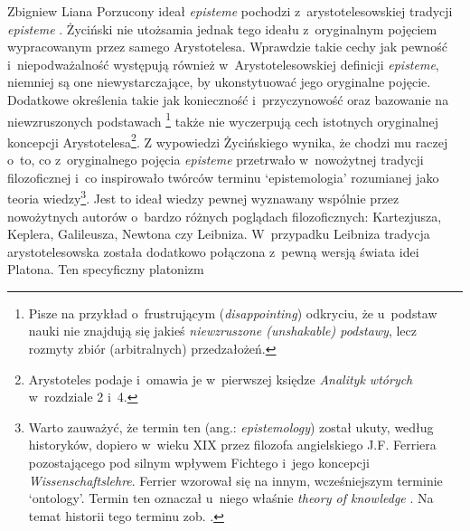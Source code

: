 \begin{artplenv}{Zbigniew Liana}
Porzucony ideał \textit{episteme} pochodzi z~arystotelesowskiej tradycji \textit{episteme}
\parencites[s.~102]{zycinski_jezyk_1983}[s.~46–55]{zycinski_granice_1993}.
Życiński nie utożsamia jednak tego ideału z~oryginalnym pojęciem wypracowanym
przez samego Arystotelesa. Wprawdzie takie cechy jak pewność i~niepodważalność występują również w~Arystotelesowskiej
definicji \textit{episteme}, niemniej są one niewystarczające, by ukonstytuować jego oryginalne pojęcie. Dodatkowe
określenia takie jak konieczność i~przyczynowość
\parencite[s.~46]{zycinski_granice_1993}
oraz bazowanie na
niewzruszonych podstawach
\parencites[s.~143]{zycinski_structure_1988}[s.~253]{zycinski_struktura_2013}\footnote{\label{lia-foo-32}Pisze na
przykład o~frustrującym (\textit{disappointing})
odkryciu, że u~podstaw nauki nie znajdują się jakieś \textit{niewzruszone (unshakable) podstawy}, lecz rozmyty zbiór
(arbitralnych) przedzałożeń.} także nie wyczerpują cech istotnych oryginalnej koncepcji
Arystotelesa\footnote{Arystoteles podaje i~omawia je w~pierwszej księdze \textit{Analityk wtórych} w~rozdziale 2 i~4.}. Z
wypowiedzi Życińskiego
\parencite*[s.~46]{zycinski_granice_1993}
wynika, że chodzi mu raczej o~to, co z~oryginalnego
pojęcia \textit{episteme} przetrwało w~nowożytnej tradycji filozoficznej i~co inspirowało twórców terminu `epistemologia'
rozumianej jako teoria wiedzy\footnote{Warto zauważyć, że termin ten (ang.: \textit{epistemology}) został ukuty,
według historyków, dopiero w~wieku XIX przez filozofa angielskiego J.F. Ferriera
pozostającego pod silnym wpływem Fichtego i~jego
koncepcji \textit{Wissenschaftslehre}. Ferrier wzorował się na innym, wcześniejszym terminie `ontology'. Termin ten
oznaczał u~niego właśnie \textit{theory of knowledge}
\parencite[zob.][s.~44]{ferrier_institutes_1854}.
Na temat
historii tego terminu zob.
\parencite[s.~63–66]{sinacoer_lepistemologie_1973}.
}. Jest to ideał wiedzy pewnej
wyznawany wspólnie przez nowożytnych autorów o~bardzo różnych poglądach filozoficznych: Kartezjusza, Keplera,
Galileusza, Newtona czy Leibniza. W~przypadku Leibniza
\parencite[s.~51]{zycinski_granice_1993}
tradycja arystotelesowska została dodatkowo połączona z~pewną wersją świata idei Platona. Ten specyficzny platonizm

\end{artplenv}
